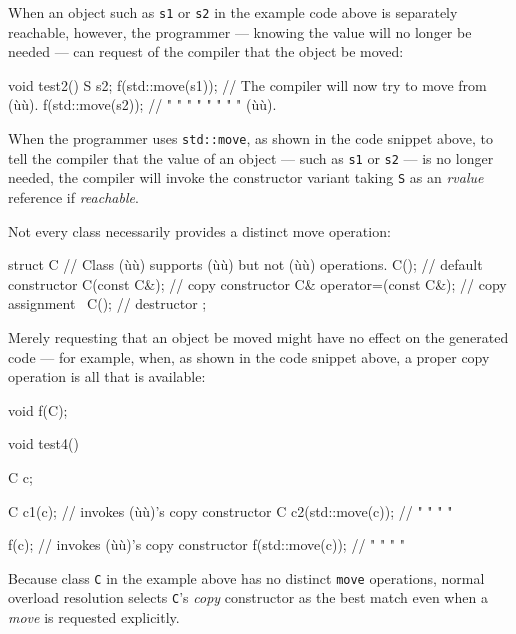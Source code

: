When an object such as \lstinline!s1! or \lstinline!s2! in the example code
above is separately reachable, however, the programmer --- knowing the
value will no longer be needed --- can request of the compiler that the
object be moved:

\begin{emcppslisting}
void test2()
{
    S s2;
    f(std::move(s1));   // The compiler will now try to move from (ù{}ù).
    f(std::move(s2));   //  "     "      "    "   "  "    "   "   (ù{}ù).
}
\end{emcppslisting}
    

\noindent When the programmer uses \lstinline!std::move!, as shown in the code
snippet above, to tell the compiler that the value of an object --- such
as \lstinline!s1! or \lstinline!s2! --- is no longer needed, the compiler will
invoke the constructor variant taking \lstinline!S! as an \emph{rvalue}
reference if \emph{reachable}.

Not every class necessarily provides a distinct move operation:

\begin{emcppslisting}
struct C  // Class (ù{}ù) supports (ù{}ù) but not (ù{}ù) operations.
{
    C();                     // default constructor
    C(const C&);             // copy constructor
    C& operator=(const C&);  // copy assignment
    ~C();                    // destructor
};
\end{emcppslisting}
    

\noindent Merely requesting that an object be moved might have no effect on the
generated code --- for example, when, as shown in the code snippet
above, a proper copy operation is all that is available:

\begin{emcppslisting}
void f(C);

void test4()
{
    C c;

    C c1(c);             // invokes (ù{}ù)'s copy constructor
    C c2(std::move(c));  //    "      "     "       "

    f(c);                // invokes (ù{}ù)'s copy constructor
    f(std::move(c));     //    "      "     "       "
}
\end{emcppslisting}
    

\noindent Because class \lstinline!C! in the example above has no distinct
\lstinline!move! operations, normal overload resolution selects
\lstinline!C!'s \emph{copy} constructor as the best match even when a
\emph{move} is requested explicitly.

